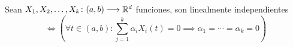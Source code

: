 \begin{defn}
	Sean $X_1, X_2, \ldots, X_k \colon (a, b) \longrightarrow \mathbb{R}^d$ funciones, son linealmente independientes
	\[\iff \left(\forall t \in (a, b) : \sum_{j=1}^{k} \alpha_i X_i (t) = 0 \implies \alpha_1 = \cdots = \alpha_k = 0 \right)\]
\end{defn}

